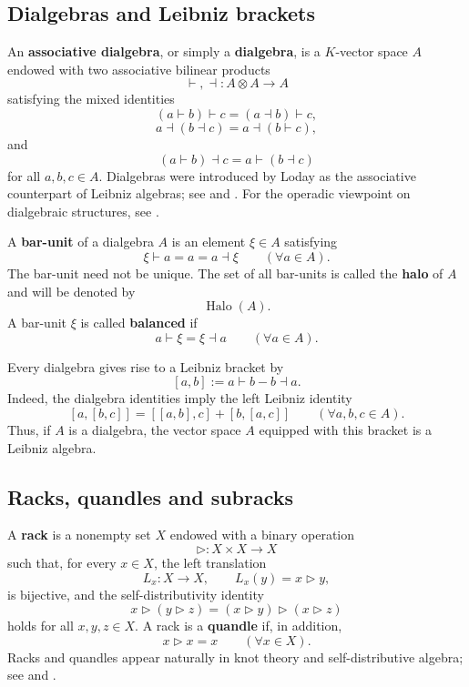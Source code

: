 \documentclass[11pt]{article}
\theoremstyle{plain}
\theoremstyle{definition}
\theoremstyle{remark}
\DeclareMathOperator{\Halo}{Halo}
\begin{document}
	\subsection{Dialgebras and Leibniz brackets}
	
	An \textbf{associative dialgebra}, or simply a \textbf{dialgebra}, is a
	\(K\)-vector space \(A\) endowed with two associative bilinear products
	\[
	\vdash,\dashv:A\otimes A\longrightarrow A
	\]
	satisfying the mixed identities
	\[
	(a\vdash b)\vdash c=(a\dashv b)\vdash c,
	\]
	\[
	a\dashv(b\dashv c)=a\dashv(b\vdash c),
	\]
	and
	\[
	(a\vdash b)\dashv c=a\vdash(b\dashv c)
	\]
	for all \(a,b,c\in A\). Dialgebras were introduced by Loday as the associative
	counterpart of Leibniz algebras; see \cite[Section~1]{Loday2001} and
	\cite[Section~1]{LodayPirashvili1993}. For the operadic viewpoint on
	dialgebraic structures, see \cite[Chapter~13]{LodayVallette2012}.
	
	A \textbf{bar-unit} of a dialgebra \(A\) is an element \(\xi\in A\) satisfying
	\[
	\xi\vdash a=a=a\dashv \xi
	\qquad
	(\forall a\in A).
	\]
	The bar-unit need not be unique. The set of all bar-units is called the
	\textbf{halo} of \(A\) and will be denoted by
	\[
	\Halo(A).
	\]
	A bar-unit \(\xi\) is called \textbf{balanced} if
	\[
	a\vdash \xi=\xi\dashv a
	\qquad
	(\forall a\in A).
	\]
	
	Every dialgebra gives rise to a Leibniz bracket by
	\[
	[a,b]:=a\vdash b-b\dashv a.
	\]
	Indeed, the dialgebra identities imply the left Leibniz identity
	\[
	[a,[b,c]]=[[a,b],c]+[b,[a,c]]
	\qquad
	(\forall a,b,c\in A).
	\]
	Thus, if \(A\) is a dialgebra, the vector space \(A\) equipped with this
	bracket is a Leibniz algebra.
	
	\subsection{Racks, quandles and subracks}
	
	A \textbf{rack} is a nonempty set \(X\) endowed with a binary operation
	\[
	\triangleright:X\times X\longrightarrow X
	\]
	such that, for every \(x\in X\), the left translation
	\[
	L_x:X\longrightarrow X,
	\qquad
	L_x(y)=x\triangleright y,
	\]
	is bijective, and the self-distributivity identity
	\[
	x\triangleright(y\triangleright z)
	=
	(x\triangleright y)\triangleright(x\triangleright z)
	\]
	holds for all \(x,y,z\in X\). A rack is a \textbf{quandle} if, in addition,
	\[
	x\triangleright x=x
	\qquad
	(\forall x\in X).
	\]
	Racks and quandles appear naturally in knot theory and self-distributive
	algebra; see \cite[Section~2]{Joyce1982} and
	\cite[Section~1]{FennRourkeSanderson1995}.
	
\end{document}
